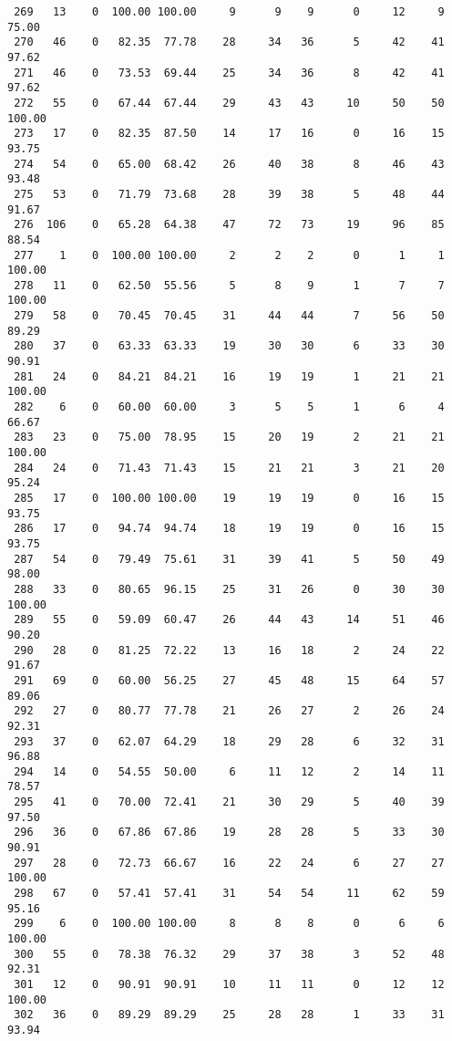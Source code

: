 \begin{verbatim}
 269   13    0  100.00 100.00     9      9    9      0     12     9    75.00
 270   46    0   82.35  77.78    28     34   36      5     42    41    97.62
 271   46    0   73.53  69.44    25     34   36      8     42    41    97.62
 272   55    0   67.44  67.44    29     43   43     10     50    50   100.00
 273   17    0   82.35  87.50    14     17   16      0     16    15    93.75
 274   54    0   65.00  68.42    26     40   38      8     46    43    93.48
 275   53    0   71.79  73.68    28     39   38      5     48    44    91.67
 276  106    0   65.28  64.38    47     72   73     19     96    85    88.54
 277    1    0  100.00 100.00     2      2    2      0      1     1   100.00
 278   11    0   62.50  55.56     5      8    9      1      7     7   100.00
 279   58    0   70.45  70.45    31     44   44      7     56    50    89.29
 280   37    0   63.33  63.33    19     30   30      6     33    30    90.91
 281   24    0   84.21  84.21    16     19   19      1     21    21   100.00
 282    6    0   60.00  60.00     3      5    5      1      6     4    66.67
 283   23    0   75.00  78.95    15     20   19      2     21    21   100.00
 284   24    0   71.43  71.43    15     21   21      3     21    20    95.24
 285   17    0  100.00 100.00    19     19   19      0     16    15    93.75
 286   17    0   94.74  94.74    18     19   19      0     16    15    93.75
 287   54    0   79.49  75.61    31     39   41      5     50    49    98.00
 288   33    0   80.65  96.15    25     31   26      0     30    30   100.00
 289   55    0   59.09  60.47    26     44   43     14     51    46    90.20
 290   28    0   81.25  72.22    13     16   18      2     24    22    91.67
 291   69    0   60.00  56.25    27     45   48     15     64    57    89.06
 292   27    0   80.77  77.78    21     26   27      2     26    24    92.31
 293   37    0   62.07  64.29    18     29   28      6     32    31    96.88
 294   14    0   54.55  50.00     6     11   12      2     14    11    78.57
 295   41    0   70.00  72.41    21     30   29      5     40    39    97.50
 296   36    0   67.86  67.86    19     28   28      5     33    30    90.91
 297   28    0   72.73  66.67    16     22   24      6     27    27   100.00
 298   67    0   57.41  57.41    31     54   54     11     62    59    95.16
 299    6    0  100.00 100.00     8      8    8      0      6     6   100.00
 300   55    0   78.38  76.32    29     37   38      3     52    48    92.31
 301   12    0   90.91  90.91    10     11   11      0     12    12   100.00
 302   36    0   89.29  89.29    25     28   28      1     33    31    93.94

\end{verbatim}
